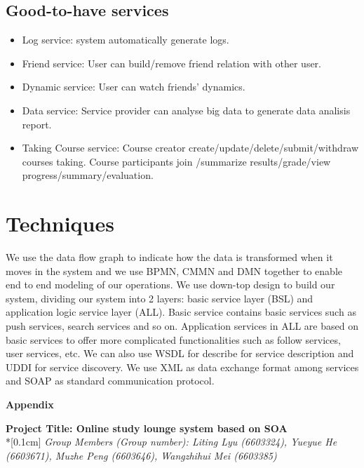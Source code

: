 \documentclass[runningheads]{llncs}
\begin{document}
\subsection*{Good-to-have services}
\begin{itemize}
    \item Log service: system automatically generate logs.
    \item Friend service: User can build/remove friend relation with other user.
    \item Dynamic service: User can watch friends' dynamics.
    \item Data service: Service provider can analyse big data to generate data analisis report.
    \item Taking Course service: Course creator create/update/delete/submit/withdraw courses taking. Course participants join /summarize results/grade/view progress/summary/evaluation.
\end{itemize}

\section*{Techniques}
We use the data flow graph to indicate how the data is transformed when it moves in the system and we use BPMN, CMMN and DMN  together to enable end to end modeling of our operations.
We use down-top design to build our system, dividing our system into 2 layers: basic service layer (BSL) and application logic service layer (ALL). Basic service contains basic services such as push services, search services and so on. Application services in ALL are based on basic services to offer more complicated functionalities such as follow services, user services, etc. We can also use WSDL for describe for service description and UDDI for service discovery. We use XML as data exchange format among services and SOAP as standard communication protocol.
\clearpage
\begin{flushleft}
    \huge{\textbf{Appendix}}
    \end{flushleft}
    \begin{center}
    \Large{\textbf{Project Title: Online study lounge system based on SOA }} \\*[0.1cm]%
    \large{\emph{Group Members (Group number): Liting Lyu (6603324), Yueyue  He (6603671), Muzhe Peng (6603646), Wangzhihui Mei (6603385)}} %
    \end{center}
    
    
    \noindent 
\end{document}
